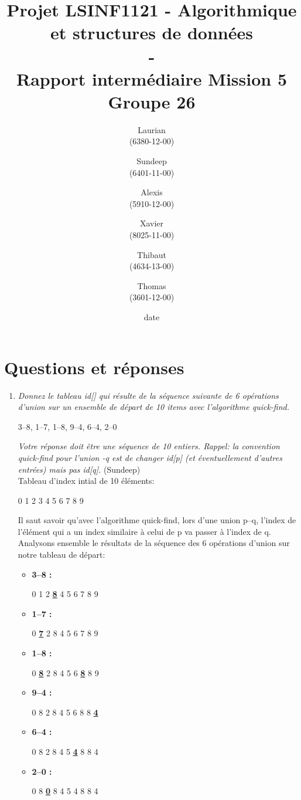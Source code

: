\documentclass[11pt]{article}
\title{\textbf{Projet LSINF1121 -  Algorithmique et structures de données\\ - \\ Rapport intermédiaire Mission 5} \\ {\large Groupe 26}}
\author{Laurian \bsc{Detiffe} \\(6380-12-00)\and Sundeep \bsc{Dhillon} \\(6401-11-00)\and Alexis \bsc{Macq} \\ (5910-12-00) \and Xavier \bsc{Pérignon} \\ (8025-11-00)\and Thibaut \bsc{Piquard}\\(4634-13-00)\and Thomas \bsc{Wyckmans} \\ (3601-12-00)}
\date{date}
\date{\vspace*{25mm}
\texttt{[image: logo.jpg]}\\
		\vspace*{30mm}
		\begin{center}
		Année académique 2015-2016 \\	
		\end{center}}
\begin{document}
\thispagestyle{empty}

\maketitle
\thispagestyle{empty}

\section*{Questions et réponses}
\begin{enumerate}

\item \textit{Donnez le tableau id[] qui résulte de la séquence suivante de 6 opérations d'union sur un ensemble de départ de 10 items avec l'algorithme quick-find.}\\
\centerline{3--8, 1--7, 1--8, 9--4, 6--4, 2--0}
\textit{Votre réponse doit être une séquence de 10 entiers. Rappel: la convention quick-find pour l'union -q est de changer id[p] (et éventuellement d'autres entrées) mais pas id[q].} (Sundeep) \bigskip \\ 
Tableau d'index intial de 10 éléments: \\
\centerline{0 1 2 3 4 5 6 7 8 9}
Il saut savoir qu'avec l'algorithme quick-find, lors d'une union p--q, l'index de l'élément qui a un index similaire à celui de p va passer à l'index de q. \\
Analysons ensemble le résultats de la séquence des 6 opérations d'union sur notre tableau de départ: \bigskip

\begin{itemize}
\item \textbf{3--8 :}\\
\centerline{0 1 2 \underline{\textbf{8}} 4 5 6 7 8 9}
\item \textbf{1--7 :}\\
\centerline{0 \underline{\textbf{7}} 2 8 4 5 6 7 8 9}
\item \textbf{1--8 :}\\
\centerline{0 \underline{\textbf{8}} 2 8 4 5 6 \underline{\textbf{8}} 8 9}
\item \textbf{9--4 :}\\
\centerline{0 8 2 8 4 5 6 8 8 \underline{\textbf{4}}}
\item \textbf{6--4 :}\\
\centerline{0 8 2 8 4 5 \underline{\textbf{4}} 8 8 4}
\item \textbf{2--0 :}\\
\centerline{0 8 \underline{\textbf{0}} 8 4 5 4 8 8 4}
\end{itemize}
\newpage



\end{enumerate}
\end{document}
